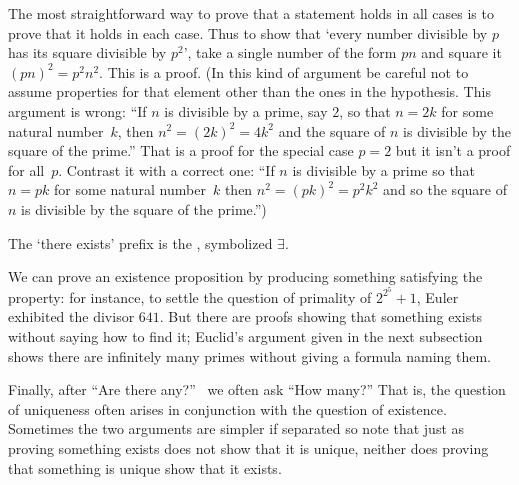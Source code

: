 The most straightforward way to prove that 
a statement holds in all cases is to 
prove that it holds in each case.
Thus to show that `every number divisible by \( p \) has its
square divisible by \( p^2 \)', take a single number of the form
\( pn \) and square it \( (pn)^2=p^2n^2 \).
This is a  proof.
(In this kind of argument be careful not to assume 
properties for that element
other than the ones in the hypothesis.
This argument is wrong:
``If \( n \) is divisible by a prime, say \( 2 \), so that \( n=2k \)
for some natural number~$k$,
then \( n^2=(2k)^2=4k^2 \) and the square of $n$ is divisible
by the square of the prime.''
That is a proof for the special case \( p=2 \) 
but it isn't a proof for all~\( p \).
Contrast it with a correct one:
``If \( n \) is divisible by a prime
so that \( n=pk \) for some natural number~$k$
then \( n^2=(pk)^2=p^2k^2 \) and so the square of $n$ is divisible
by the square of the prime.'')




The `there exists' prefix is the 
,
symbolized 
\( \exists \).


We can prove
an existence proposition by producing something satisfying
the property: for instance, to settle the question of primality of
\( 2^{2^5}+1 \), Euler exhibited the divisor \( 641 \)\cite{Sandifer}.
But there are proofs
showing that something exists without saying how to find it;
Euclid's argument given in the next subsection
shows there are infinitely many primes without giving a formula naming them.

Finally, after
``Are there any?''\ %
we often ask ``How many?''
That is, the question of uniqueness often arises in conjunction
with the question of existence.
Sometimes the two arguments are simpler if separated so note that just as
proving something exists does not show that it is unique,
neither does proving that something is unique show that it exists.










